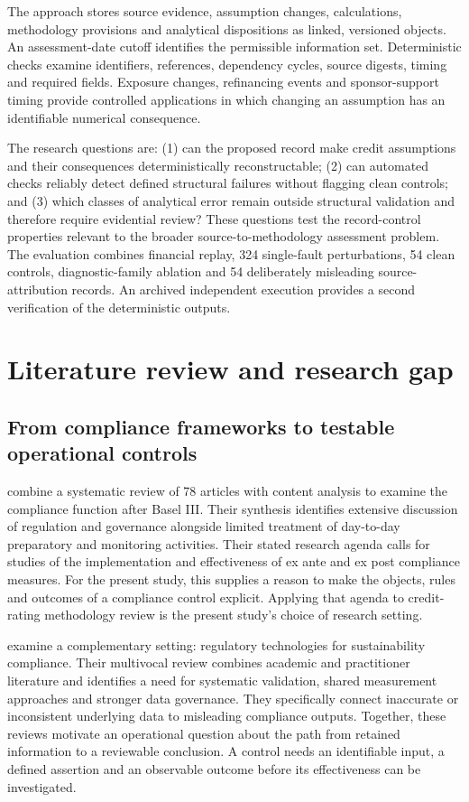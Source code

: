 \documentclass[11pt,a4paper]{article}
\begin{document}
The approach stores source evidence, assumption changes, calculations, methodology provisions and analytical dispositions as linked, versioned objects. An assessment-date cutoff identifies the permissible information set. Deterministic checks examine identifiers, references, dependency cycles, source digests, timing and required fields. Exposure changes, refinancing events and sponsor-support timing provide controlled applications in which changing an assumption has an identifiable numerical consequence.

The research questions are: (1) can the proposed record make credit assumptions and their consequences deterministically reconstructable; (2) can automated checks reliably detect defined structural failures without flagging clean controls; and (3) which classes of analytical error remain outside structural validation and therefore require evidential review? These questions test the record-control properties relevant to the broader source-to-methodology assessment problem. The evaluation combines financial replay, 324 single-fault perturbations, 54 clean controls, diagnostic-family ablation and 54 deliberately misleading source-attribution records. An archived independent execution provides a second verification of the deterministic outputs.

\section{Literature review and research gap}

\subsection{From compliance frameworks to testable operational controls}

\citet{castro2026} combine a systematic review of 78 articles with content analysis to examine the compliance function after Basel III. Their synthesis identifies extensive discussion of regulation and governance alongside limited treatment of day-to-day preparatory and monitoring activities. Their stated research agenda calls for studies of the implementation and effectiveness of ex ante and ex post compliance measures. For the present study, this supplies a reason to make the objects, rules and outcomes of a compliance control explicit. Applying that agenda to credit-rating methodology review is the present study's choice of research setting.

\citet{golzarjannat2026} examine a complementary setting: regulatory technologies for sustainability compliance. Their multivocal review combines academic and practitioner literature and identifies a need for systematic validation, shared measurement approaches and stronger data governance. They specifically connect inaccurate or inconsistent underlying data to misleading compliance outputs. Together, these reviews motivate an operational question about the path from retained information to a reviewable conclusion. A control needs an identifiable input, a defined assertion and an observable outcome before its effectiveness can be investigated.
\end{document}
